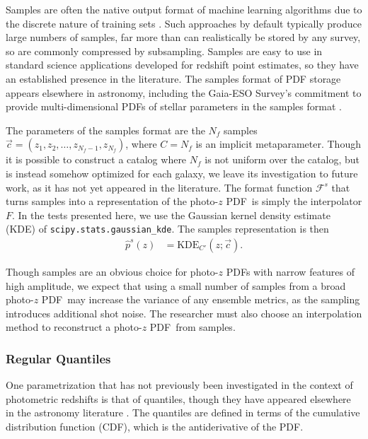 \documentclass[\docopts]{\docclass}
\newcommand{\pz}{photo-$z$ PDF}
\begin{document}
Samples are often the native output format of machine learning algorithms due 
to the discrete nature of training sets \citep{de_vicente_dnf_2016}.
Such approaches by default typically produce large numbers of samples, far more 
than can realistically be stored by any survey, so are commonly compressed by 
subsampling\citep{hoyle_dark_2017}.
Samples are easy to use in standard science applications developed for redshift 
point estimates, so they have an established presence in the 
literature\citep{bonnett_redshift_2016}.
The samples format of PDF storage appears elsewhere in astronomy, including the 
Gaia-ESO Survey's commitment to provide multi-dimensional PDFs of stellar 
parameters in the samples format \citep{bailer-jones_gaia_2013}.

The parameters of the samples format are the $N_{f}$ samples $\vec{c}=(z_{1}, 
z_{2}, \dots, z_{N_{f}-1}, z_{N_{f}})$, where $C=N_{f}$ is an implicit 
metaparameter.
Though it is possible to construct a catalog where $N_{f}$ is not uniform over 
the catalog, but is instead somehow optimized for each galaxy, we leave its 
investigation to future work, as it has not yet appeared in the literature.
The format function $\mathcal{F}^{s}$ that turns samples into a representation 
of the \pz\ is simply the interpolator $F$.
In the tests presented here, we use the Gaussian kernel density estimate (KDE) 
of \texttt{scipy.stats.gaussian\_kde}.
The samples representation is then
\begin{align}
  \label{eq:sampled}
  \hat{p}^{s}(z) &= \mathrm{KDE}_{C'}(z; \vec{c}).
\end{align}

Though samples are an obvious choice for \pz s with narrow features of high 
amplitude, we expect that using a small number of samples from a broad \pz\ may 
increase the variance of any ensemble metrics, as the sampling introduces 
additional shot noise.
The researcher must also choose an interpolation method to reconstruct a \pz\ 
from samples.

\subsubsection{Regular Quantiles}
\label{sec:quantiles}

One parametrization that has not previously been investigated in the context of 
photometric redshifts is that of quantiles, though they have appeared elsewhere 
in the astronomy literature \citep{sun_star_2015, pizzocaro_results_2016, 
laycock_x-ray_2017}.
The quantiles are defined in terms of the cumulative distribution function 
(CDF), which is the antiderivative of the PDF.
\end{document}

